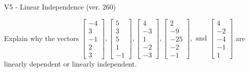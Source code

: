 \begin{exercise}
  \begin{exerciseTitle}V5 - Linear Independence (ver. 260)\end{exerciseTitle}
  \begin{exerciseStatement}
    Explain why the vectors \(\left[\begin{array}{r}
-4 \\
3 \\
-1 \\
2 \\
3
\end{array}\right] , \left[\begin{array}{r}
5 \\
3 \\
5 \\
1 \\
-1
\end{array}\right] , \left[\begin{array}{r}
4 \\
-3 \\
1 \\
-2 \\
-3
\end{array}\right] , \left[\begin{array}{r}
2 \\
-9 \\
-25 \\
-2 \\
-1
\end{array}\right] , \text{ and } \left[\begin{array}{r}
4 \\
-2 \\
-4 \\
-1 \\
1
\end{array}\right]\) are linearly dependent or linearly independent.	



\end{exerciseStatement}
\end{exercise}
